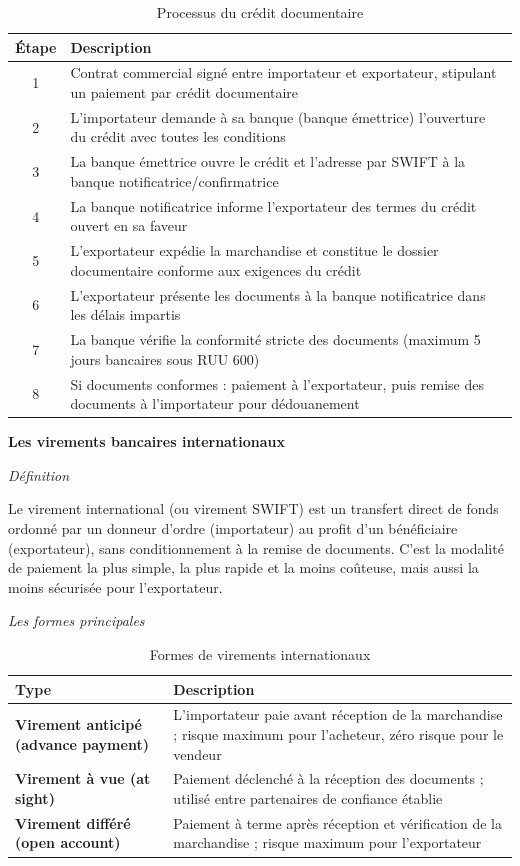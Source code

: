 \documentclass[12pt,a4paper]{report}
\begin{document}
\begin{table}[h!]
\centering
\begin{tabularx}{\textwidth}{c X}
\toprule
Étape & Description \\
\midrule
1 & Contrat commercial signé entre importateur et exportateur, stipulant un paiement par crédit documentaire \\
2 & L'importateur demande à sa banque (banque émettrice) l'ouverture du crédit avec toutes les conditions \\
3 & La banque émettrice ouvre le crédit et l'adresse par SWIFT à la banque notificatrice/confirmatrice \\
4 & La banque notificatrice informe l'exportateur des termes du crédit ouvert en sa faveur \\
5 & L'exportateur expédie la marchandise et constitue le dossier documentaire conforme aux exigences du crédit \\
6 & L'exportateur présente les documents à la banque notificatrice dans les délais impartis \\
7 & La banque vérifie la conformité stricte des documents (maximum 5 jours bancaires sous RUU 600) \\
8 & Si documents conformes : paiement à l'exportateur, puis remise des documents à l'importateur pour dédouanement \\
\bottomrule
\end{tabularx}
\caption{Processus du crédit documentaire}
\end{table}

\medskip\textbf{Les virements bancaires internationaux}

\medskip\textit{Définition}

Le virement international (ou virement SWIFT) est un transfert direct de fonds ordonné par un donneur d'ordre (importateur) au profit d'un bénéficiaire (exportateur), sans conditionnement à la remise de documents. C'est la modalité de paiement la plus simple, la plus rapide et la moins coûteuse, mais aussi la moins sécurisée pour l'exportateur.

\medskip\textit{Les formes principales}

\begin{table}[h!]
\centering
\begin{tabularx}{\textwidth}{>{\bfseries}l X}
\toprule
Type & Description \\
\midrule
Virement anticipé (advance payment) & L'importateur paie avant réception de la marchandise ; risque maximum pour l'acheteur, zéro risque pour le vendeur \\
\addlinespace
Virement à vue (at sight) & Paiement déclenché à la réception des documents ; utilisé entre partenaires de confiance établie \\
\addlinespace
Virement différé (open account) & Paiement à terme après réception et vérification de la marchandise ; risque maximum pour l'exportateur \\
\bottomrule
\end{tabularx}
\caption{Formes de virements internationaux}
\end{table}
\end{document}
